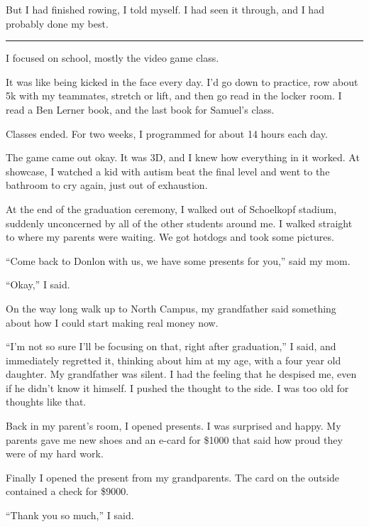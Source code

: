 But I had finished rowing, I told myself.  I had seen it through, and I had
probably done my best.

\plainfancybreak{12pt}{2}{* * *}

I focused on school, mostly the video game class.

It was like being kicked in the face every day.  I'd go down to practice, row
about 5k with my teammates, stretch or lift, and then go read in the locker
room.  I read a Ben Lerner book, and the last book for Samuel's class.

Classes ended.  For two weeks, I programmed for about 14 hours each day.  

The game came out okay.  It was 3D, and I knew how everything in it worked.  At
showcase, I watched a kid with autism beat the final level and went to the
bathroom to cry again, just out of exhaustion.

At the end of the graduation ceremony, I walked out of Schoelkopf stadium,
suddenly unconcerned by all of the other students around me.  I walked straight
to where my parents were waiting.  We got hotdogs and took some pictures.  

``Come back to Donlon with us, we have some presents for you,'' said my mom. 

``Okay,'' I said.  

On the way long walk up to North Campus, my grandfather said something about how
I could start making real money now.

``I'm not so sure I'll be focusing on that, right after graduation,'' I said,
and immediately regretted it, thinking about him at my age, with a four year old
daughter.  My grandfather was silent.  I had the feeling that he despised me,
even if he didn't know it himself.  I pushed the thought to the side.  I was too
old for thoughts like that.

Back in my parent's room, I opened presents.  I was surprised and happy. My
parents gave me new shoes and an e-card for \$1000 that said how proud they were
of my hard work.  

Finally I opened the present from my grandparents.  The card on the outside
contained a check for \$9000.  

``Thank you so much,'' I said.
